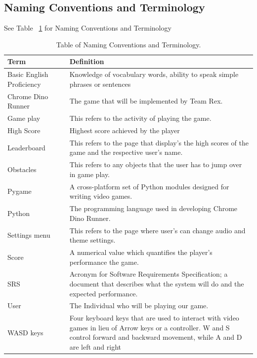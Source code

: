 \documentclass[12pt]{article}
\begin{document}
	\subsection{Naming Conventions and Terminology}
	See Table ~\ref{table:naming} for Naming Conventions and Terminology
	\begin{table}[] 
		\centering
		\caption{Table of Naming Conventions and Terminology.}
		\begin{tabular}{l c p{}}
			\toprule
			Term       && Definition \\
			\midrule
			Basic English Proficiency && Knowledge of vocabulary words, ability to speak simple phrases or sentences \\
			\midrule
			Chrome Dino Runner  && The game that will be implemented by Team Rex. \\
			\midrule
			Game play && This refers to the activity of playing the game. \\
			\midrule
			High Score          && Highest score achieved by the player \\
			\midrule
			
			Leaderboard && This refers to the page that display's the high scores of the game and the respective user's name. \\
			\midrule 
			Obstacles && This refers to any objects that the user has to jump over in game play. \\
			\midrule
			Pygame              && A cross-platform set of Python modules designed for writing video games. \\
			\midrule
			Python              && The programming language used in developing Chrome Dino Runner. \\
			\midrule
			
			Settings menu && This refers to the page where user's can change audio and theme settings. \\
			\midrule
			Score               && A numerical value which quantifies the player's performance the game. \\
			\midrule
			SRS       && Acronym for Software Requirements Specification; a document that describes what the system will do and the expected performance. \\
			\midrule
			User       && The Individual who will be playing  our game. \\
			\midrule
			WASD keys           && Four keyboard keys that are used to interact with video games in lieu of Arrow keys or a controller. W and S control forward and backward movement, while A and D are left and right \\
			
			
			\bottomrule
		\end{tabular}
		\label{table:naming}
	\end{table}
	
\end{document}

